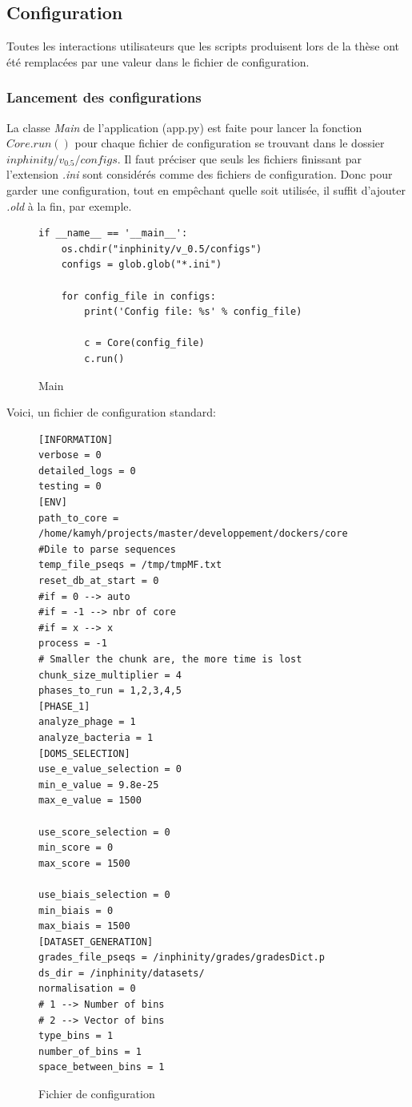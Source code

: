 \subsection{Configuration}
\label{ch:config}

Toutes les interactions utilisateurs que les scripts produisent lors de la thèse \thLeite ont été remplacées par une valeur dans le fichier de configuration.

\subsubsection{Lancement des configurations}

La classe \emph{Main} de l'application (app.py) est faite pour lancer la fonction \emph{$Core.run()$} pour chaque fichier de configuration se trouvant dans le dossier \emph{$inphinity/v_0.5/configs$}. Il faut préciser que seuls les fichiers finissant par l'extension \emph{.ini} sont considérés comme des fichiers de configuration. Donc pour garder une configuration, tout en empêchant quelle soit utilisée, il suffit d'ajouter \emph{.old} à la fin, par exemple.

\begin{figure}[H] 
\centering 
\begin{lstlisting}[frame=single]
if __name__ == '__main__':
    os.chdir("inphinity/v_0.5/configs")
    configs = glob.glob("*.ini")

    for config_file in configs:
        print('Config file: %s' % config_file)

        c = Core(config_file)
        c.run()
\end{lstlisting}
\caption[Main]{Main}
\label{fig:main} 
\end{figure}

Voici, un fichier de configuration standard:

\begin{figure}[H] 
\centering 
\begin{lstlisting}[frame=single]
[INFORMATION]
verbose = 0
detailed_logs = 0
testing = 0
[ENV]
path_to_core = /home/kamyh/projects/master/developpement/dockers/core
#Dile to parse sequences
temp_file_pseqs = /tmp/tmpMF.txt
reset_db_at_start = 0
#if = 0 --> auto
#if = -1 --> nbr of core
#if = x --> x
process = -1
# Smaller the chunk are, the more time is lost
chunk_size_multiplier = 4
phases_to_run = 1,2,3,4,5
[PHASE_1]
analyze_phage = 1
analyze_bacteria = 1
[DOMS_SELECTION]
use_e_value_selection = 0
min_e_value = 9.8e-25
max_e_value = 1500

use_score_selection = 0
min_score = 0
max_score = 1500

use_biais_selection = 0
min_biais = 0
max_biais = 1500
[DATASET_GENERATION]
grades_file_pseqs = /inphinity/grades/gradesDict.p
ds_dir = /inphinity/datasets/
normalisation = 0
# 1 --> Number of bins
# 2 --> Vector of bins
type_bins = 1
number_of_bins = 1
space_between_bins = 1
\end{lstlisting}
\caption[Fichier de configuration]{Fichier de configuration}
\label{fig:configFile} 
\end{figure}

